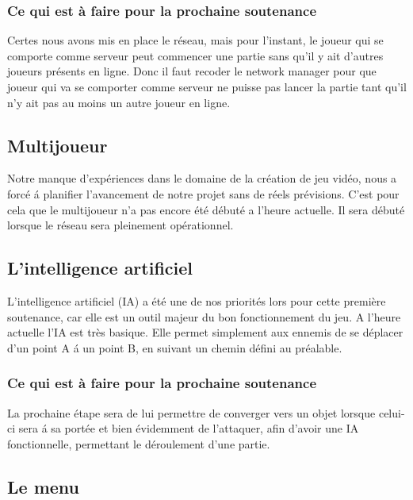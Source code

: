 \documentclass[a4paper, 12pt]{article}
\begin{document}
\subsubsection*{Ce qui est à faire pour la prochaine soutenance}

\par Certes nous avons mis en place le réseau, mais pour l’instant, le joueur qui se comporte comme serveur peut commencer une partie sans qu’il y ait d’autres joueurs présents en ligne. Donc il faut recoder le network manager  pour que joueur qui va se comporter comme serveur ne puisse pas lancer la partie tant qu’il n'y ait pas au moins un autre joueur en ligne.

\newpage
	\subsection{Multijoueur}
	Notre manque d'expériences dans le domaine de la création de jeu vidéo, nous a forcé \'a planifier l'avancement de notre projet sans de réels prévisions. C'est pour cela que le multijoueur n'a pas encore été débuté a l'heure actuelle. Il sera débuté lorsque le réseau sera pleinement opérationnel. 
	
	\subsection{L'intelligence artificiel}
	L'intelligence artificiel (IA) a été une de nos priorités lors pour cette première soutenance, car elle est un outil majeur du bon fonctionnement du jeu. A l'heure actuelle l'IA est très basique. Elle permet simplement aux ennemis de se déplacer d'un point A \'a  un point B, en suivant un chemin défini au préalable.
	
\subsubsection*{Ce qui est à faire pour la prochaine soutenance}	
	
	\par La prochaine étape sera de lui permettre de converger vers un objet lorsque celui-ci sera \'a sa portée et bien évidemment de l'attaquer, afin d'avoir une IA fonctionnelle, permettant le déroulement d'une partie.

	\subsection{Le menu}
	
\end{document}
